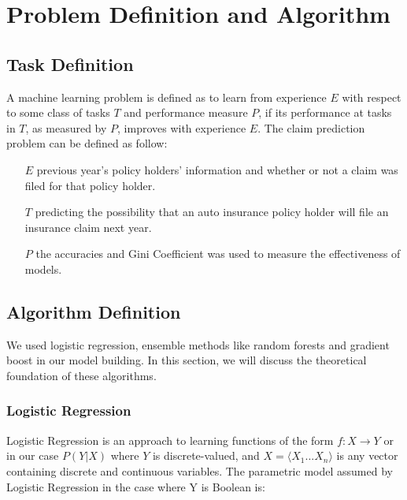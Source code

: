 \documentclass{standalone}
\begin{document}
\section{Problem Definition and Algorithm}\label{problem}

\subsection{Task Definition}


A machine learning problem is defined as to learn from experience $E$ with
respect to some class of tasks $T$ and performance measure $P$, if its
performance at tasks in $T$, as measured by $P$, improves with experience
$E$\cite{Mitchell:1997:ML:541177}. The claim prediction problem can be defined
as follow:

\begin{itemize}[] 
    \item[$E$] previous year's policy holders' information and whether or not a
        claim was filed for that policy holder.
    \item[$T$] predicting the possibility that an auto insurance policy holder
        will file an insurance claim next year.
    \item[$P$] the accuracies and Gini Coefficient was used to measure the
        effectiveness of models.
\end{itemize}

\subsection{Algorithm Definition}

We used logistic regression, ensemble methods like random forests and gradient
boost in our model building. In this section, we will discuss the theoretical
foundation of these algorithms.

\subsubsection{Logistic Regression}

Logistic Regression is an approach to learning functions of the form
$f:X\rightarrow Y$\cite{Mitchell:2016} or in our case $P(Y|X)$ where $Y$ is
discrete-valued, and $X = \langle X_1 ...X_n\rangle$ is any vector containing
discrete and continuous variables. The parametric model assumed by Logistic
Regression in the case where Y is Boolean is:
\end{document}
